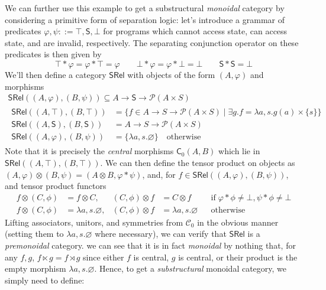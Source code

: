 \documentclass[acmsmall,screen,review]{acmart}
\newcommand{\mc}[1]{\ensuremath{\mathcal{#1}}}
\newcommand{\ms}[1]{\ensuremath{\mathsf{#1}}}
\begin{document}
We can further use this example to get a substructural \textit{monoidal} category by considering a primitive form of separation logic: let's introduce a grammar of predicates \(\varphi, \psi ::= \top, \ms{S}, \bot\) for programs which cannot access state, can access state, and are invalid, respectively. The separating conjunction operator on these predicates is then given by
\begin{equation}
  \top * \varphi = \varphi * \top = \varphi
  \qquad
  \bot * \varphi = \varphi * \bot = \bot
  \qquad
  \ms{S} * \ms{S} = \bot
\end{equation}
We'll then define a category \(\ms{SRel}\) with objects of the form \((A, \varphi)\) and morphisms
\begin{equation}
  \begin{gathered}
    \boxed{
      \ms{SRel}((A, \varphi), (B, \psi)) 
      \subseteq A \to \ms{S} \to \mc{P}(A \times S) 
    }
    \\
    \begin{aligned}
      \ms{SRel}((A, \top), (B, \top)) &= \{f \in A \to S \to \mc{P}(A \times S) \mid \exists g. f = \lambda a, s. g(a) \times \{s\}\} \\
      \ms{SRel}((A, \ms{S}), (B, \ms{S})) &= A \to S \to \mc{P}(A \times S) \\
      \ms{SRel}((A, \varphi), (B, \psi)) &= \{\lambda a, s. \varnothing\} \quad \text{otherwise}
    \end{aligned}
  \end{gathered}
\end{equation}
Note that it is precisely the \textit{central} morphisms \(\ms{C}_0(A, B)\) which lie in \(\ms{SRel}((A, \top), (B, \top))\). We can then define the tensor product on objects as \((A, \varphi) \otimes (B, \psi) = (A \otimes B, \varphi * \psi)\), and, for \(f \in \mathsf{SRel}((A, \varphi), (B, \psi))\), and tensor product functors
\begin{equation}
  \begin{aligned}
  f \otimes (C, \phi) &= f \otimes C,
  & (C, \phi) \otimes f &= C \otimes f
  && \text{if}\; \varphi * \phi \neq \bot, \psi * \phi \neq \bot \\
  f \otimes (C, \phi) &= \lambda a, s. \varnothing,
  & (C, \phi) \otimes f &=  \lambda a, s. \varnothing
  && \text{otherwise}
  \end{aligned} 
\end{equation}
Lifting associators, unitors, and symmetries from \(\mc{C}_0\) in the obvious manner (setting them to \(\lambda a, s. \varnothing\) where necessary), we can verify that \(\ms{SRel}\) is a \textit{premonoidal} category. we can see that it is in fact \textit{monoidal} by nothing that, for any \(f, g\), \(f \ltimes g = f \rtimes g\) since either \(f\) is central, \(g\) is central, or their product is the empty morphism \(\lambda a, s. \varnothing\). Hence, to get a \textit{substructural} monoidal category, we simply need to define:
\end{document}
